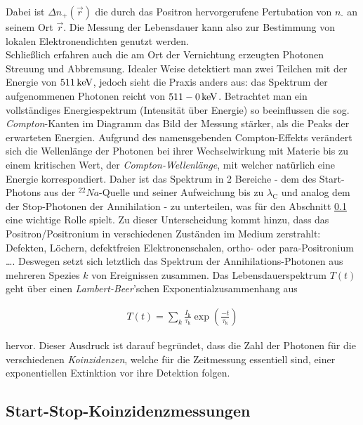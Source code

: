 \documentclass[numbers=noenddot,a4paper]{scrartcl}
\newcommand{\ix}[1]{_\text{#1}}
\newcommand{\tilt}[1]{\textit{#1}}
\begin{document}
			Dabei ist $\Delta n\ix{+}\left(\vec{r}\right)$ die durch das Positron hervorgerufene Pertubation von $n\ix{-}$ an seinem Ort $\vec{r}$. Die Messung der Lebensdauer kann also zur Bestimmung von lokalen Elektronendichten genutzt werden.\\
			Schließlich erfahren auch die am Ort der Vernichtung erzeugten Photonen Streuung und Abbremsung. Idealer Weise detektiert man zwei Teilchen mit der Energie von $\unit[511]{keV}$, jedoch sieht die Praxis anders aus: das Spektrum der aufgenommenen Photonen reicht von \mbox{$\unit[511-0]{keV}$}. Betrachtet man ein vollständiges Energiespektrum (Intensität über Energie) so beeinflussen die sog. \tilt{Compton}-Kanten im Diagramm das Bild der Messung stärker, als die Peaks der erwarteten Energien. Aufgrund des namensgebenden Compton-Effekts verändert sich die Wellenlänge der Photonen bei ihrer Wechselwirkung mit Materie bis zu einem kritischen Wert, der \tilt{Compton-Wellenlänge}, mit welcher natürlich eine Energie korrespondiert. Daher ist das Spektrum in 2 Bereiche - dem des Start-Photons aus der $^{22}Na$-Quelle und seiner Aufweichung bis zu $\lambda\ix{C}$ und analog dem der Stop-Photonen der Annihilation - zu unterteilen, was für den Abschnitt \ref{subsec:koinz} eine wichtige Rolle spielt. Zu dieser Unterscheidung kommt hinzu, dass das Positron/Positronium in verschiedenen Zuständen im Medium zerstrahlt: Defekten, Löchern, defektfreien Elektronenschalen, ortho- oder para-Positronium \dots . Deswegen setzt sich letztlich das Spektrum der Annihilations-Photonen aus mehreren Spezies $k$ von Ereignissen zusammen. Das Lebensdauerspektrum $T\left(t\right)$ geht über einen \tilt{Lambert-Beer}'schen Exponentialzusammenhang aus

			\begin{align}
				T\left(t\right)=\sum_{k}\frac{I\ix{k}}{\tau\ix{k}}\exp\left(\frac{-t}{\tau\ix{k}}\right)
			\end{align}

			hervor. Dieser Ausdruck ist darauf begründet, dass die Zahl der Photonen für die verschiedenen \tilt{Koinzidenzen}, welche für die Zeitmessung essentiell sind, einer exponentiellen Extinktion vor ihre Detektion folgen.

		\subsection{Start-Stop-Koinzidenzmessungen}\label{subsec:koinz}
\end{document}
